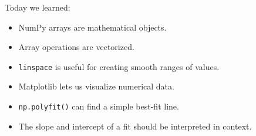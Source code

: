 \documentclass[11pt]{article}
\begin{document}
Today we learned:

\begin{itemize}
    \item NumPy arrays are mathematical objects.
    \item Array operations are vectorized.
    \item \texttt{linspace} is useful for creating smooth ranges of values.
    \item Matplotlib lets us visualize numerical data.
    \item \texttt{np.polyfit()} can find a simple best-fit line.
    \item The slope and intercept of a fit should be interpreted in context.
\end{itemize}
\end{document}
